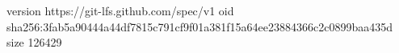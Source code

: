 version https://git-lfs.github.com/spec/v1
oid sha256:3fab5a90444a44df7815c791cf9f01a381f15a64ee23884366c2c0899baa435d
size 126429
